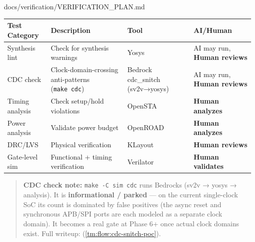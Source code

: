 \begin{relocated}{docs/verification/VERIFICATION_PLAN.md}
{{
\begin{longtable}[]{@{}
  >{\centering\arraybackslash}p{}
  >{\centering\arraybackslash}p{}
  >{\centering\arraybackslash}p{}
  >{\centering\arraybackslash}p{}@{}}
\toprule\noalign{}
\begin{minipage}[b]{\linewidth}\centering
Test Category
\end{minipage} & \begin{minipage}[b]{\linewidth}\centering
Description
\end{minipage} & \begin{minipage}[b]{\linewidth}\centering
Tool
\end{minipage} & \begin{minipage}[b]{\linewidth}\centering
AI/Human
\end{minipage} \\
\midrule\noalign{}
\endhead
\bottomrule\noalign{}
\endlastfoot
Synthesis lint & Check for synthesis warnings & Yosys & AI may run,
\textbf{Human reviews} \\
CDC check & Clock-domain-crossing anti-patterns (\texttt{make\ cdc}) &
Bedrock cdc\_\allowbreak{}snitch (sv2v→yosys) & AI may run,
\textbf{Human reviews} \\
Timing analysis & Check setup/\allowbreak{}hold violations & OpenSTA &
\textbf{Human analyzes} \\
Power analysis & Validate power budget & OpenROAD & \textbf{Human
analyzes} \\
DRC/LVS & Physical verification & KLayout & \textbf{Human reviews} \\
Gate-level sim & Functional + timing verification & Verilator &
\textbf{Human validates} \\
\end{longtable}
}

}

\begin{quote}
\textbf{CDC check note:} \texttt{make\ -\allowbreak{}C\ sim\ cdc} runs
Bedrock\textquotesingle s  (sv2v → yosys → analysis).
It is \textbf{informational / parked} --- on the current single-clock
SoC its  count is dominated by false positives (the async
reset and synchronous APB/SPI ports are each modeled as a separate clock
domain). It becomes a real  gate at Phase 6+ once actual
clock domains exist. Full writeup:
 (\cref{tm:flow:cdc-snitch-poc}).
\end{quote}


\end{relocated}
